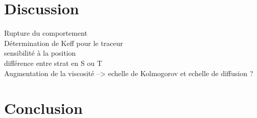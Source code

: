 \documentclass[a4paper,12pt]{article}
\begin{document}
\section{Discussion}

Rupture du comportement \\
Détermination de Keff pour le traceur \\
sensibilité à la position \\
différence entre strat en S ou T \\
Augmentation de la viscosité --> echelle de Kolmogorov et echelle de diffusion ?


\section{Conclusion}



\end{document}
